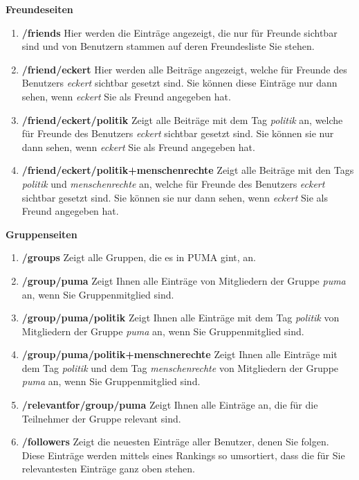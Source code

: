 \documentclass[a4paper,11pt,twoside]{scrbook}
\begin{document}
\textbf{Freundeseiten} 
\begin{enumerate}
    \item \textbf{/friends} \newline
    Hier werden die Einträge angezeigt, die nur für Freunde sichtbar sind und von Benutzern stammen auf deren Freundesliste Sie stehen.
    \item \textbf{/friend/eckert} \newline
    Hier werden alle Beiträge angezeigt, welche für Freunde des Benutzers \textit{eckert} sichtbar gesetzt sind. Sie können diese Einträge nur dann sehen, wenn \textit{eckert} Sie als Freund angegeben hat.
    \item \textbf{/friend/eckert/politik} \newline
    Zeigt alle Beiträge mit dem Tag \textit{politik} an, welche für Freunde des Benutzers \textit{eckert} sichtbar gesetzt sind. Sie können sie nur dann sehen, wenn \textit{eckert} Sie als Freund angegeben hat.
    \item \textbf{/friend/eckert/politik+menschenrechte} \newline
    Zeigt alle Beiträge mit den Tags \textit{politik} und \textit{menschenrechte} an, welche für Freunde des Benutzers \textit{eckert} sichtbar gesetzt sind. Sie können sie nur dann sehen, wenn \textit{eckert} Sie als Freund angegeben hat.
\end{enumerate}
\textbf{Gruppenseiten}
\begin{enumerate}
    \item \textbf{/groups} \newline
    Zeigt alle Gruppen, die es in PUMA gint, an.
    \item \textbf{/group/puma} \newline
    Zeigt Ihnen alle Einträge von Mitgliedern der Gruppe \textit{puma} an, wenn Sie Gruppenmitglied sind.
    \item \textbf{/group/puma/politik}\newline
    Zeigt Ihnen alle Einträge mit dem Tag \textit{politik} von Mitgliedern der Gruppe \textit{puma} an, wenn Sie Gruppenmitglied sind.
    \item \textbf{/group/puma/politik+menschnerechte}\newline
    Zeigt Ihnen alle Einträge mit dem Tag \textit{politik} und dem Tag \textit{menschenrechte} von Mitgliedern der Gruppe \textit{puma} an, wenn Sie Gruppenmitglied sind.
    \item \textbf{/relevantfor/group/puma} \newline
    Zeigt Ihnen alle Einträge an,  die für die Teilnehmer der Gruppe relevant sind.
    \item \textbf{/followers} \newline
    Zeigt die neuesten Einträge aller Benutzer, denen Sie folgen. Diese Einträge werden mittels eines Rankings so umsortiert, dass die für Sie relevantesten Einträge ganz oben stehen. %
\end{enumerate}
\end{document}
